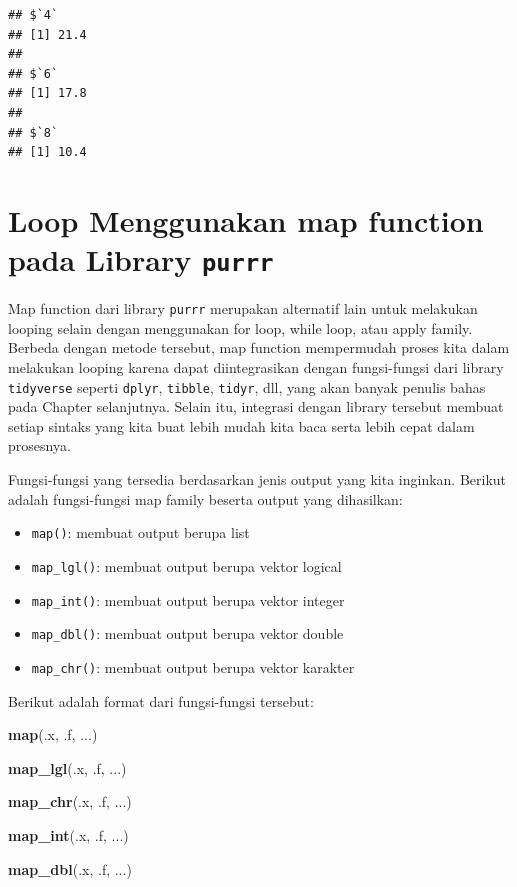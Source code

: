 \documentclass[]{book}
\newenvironment{Shaded}{\begin{snugshade}}{\end{snugshade}}
\newcommand{\KeywordTok}[1]{\textcolor[rgb]{0.13,0.29,0.53}{\textbf{#1}}}
\newcommand{\NormalTok}[1]{#1}
\providecommand{\tightlist}{%
  \setlength{\itemsep}{0pt}\setlength{\parskip}{0pt}}
\begin{document}
\begin{verbatim}
## $`4`
## [1] 21.4
## 
## $`6`
## [1] 17.8
## 
## $`8`
## [1] 10.4
\end{verbatim}

\section{\texorpdfstring{Loop Menggunakan map function pada Library
\texttt{purrr}}{Loop Menggunakan map function pada Library purrr}}\label{loop-menggunakan-map-function-pada-library-purrr}

Map function dari library \texttt{purrr} merupakan alternatif lain untuk
melakukan looping selain dengan menggunakan for loop, while loop, atau
apply family. Berbeda dengan metode tersebut, map function mempermudah
proses kita dalam melakukan looping karena dapat diintegrasikan dengan
fungsi-fungsi dari library \texttt{tidyverse} seperti \texttt{dplyr},
\texttt{tibble}, \texttt{tidyr}, dll, yang akan banyak penulis bahas
pada Chapter selanjutnya. Selain itu, integrasi dengan library tersebut
membuat setiap sintaks yang kita buat lebih mudah kita baca serta lebih
cepat dalam prosesnya.

Fungsi-fungsi yang tersedia berdasarkan jenis output yang kita inginkan.
Berikut adalah fungsi-fungsi map family beserta output yang dihasilkan:

\begin{itemize}
\tightlist
\item
  \texttt{map()}: membuat output berupa list
\item
  \texttt{map\_lgl()}: membuat output berupa vektor logical
\item
  \texttt{map\_int()}: membuat output berupa vektor integer
\item
  \texttt{map\_dbl()}: membuat output berupa vektor double
\item
  \texttt{map\_chr()}: membuat output berupa vektor karakter
\end{itemize}

Berikut adalah format dari fungsi-fungsi tersebut:

\begin{Shaded}
\begin{Highlighting}[]
\KeywordTok{map}\NormalTok{(.x, .f, ...)}

\KeywordTok{map_lgl}\NormalTok{(.x, .f, ...)}

\KeywordTok{map_chr}\NormalTok{(.x, .f, ...)}

\KeywordTok{map_int}\NormalTok{(.x, .f, ...)}

\KeywordTok{map_dbl}\NormalTok{(.x, .f, ...)}
\end{Highlighting}
\end{Shaded}
\end{document}
